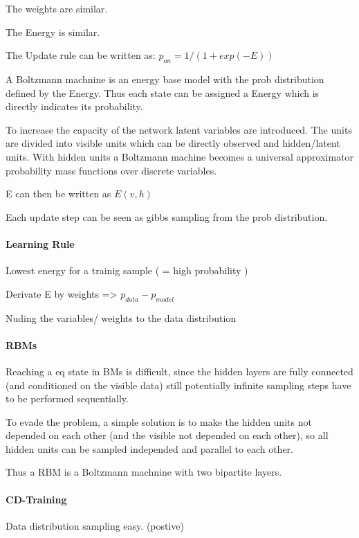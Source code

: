 The weights are similar.

The Energy is similar.

The Update rule can be written as: $ p_{on} = 1 / (1+ exp(-E)) $ 

A Boltzmann machnine is an energy base model with the prob distribution defined by the Energy.
Thus each state can be assigned a Energy which is directly indicates its probability.

To increase the capacity of the network latent variables are introduced. 
The units are divided into visible units which can be directly observed and hidden/latent units.
With hidden units a Boltzmann machine becomes a universal approximator probability mass functions over discrete variables.

E can then be written as $E(v,h)$

Each update step can be seen as gibbs sampling from the prob distribution.

\paragraph{Learning Rule}

Lowest energy for a trainig sample ( = high probability )

Derivate E by weights => $p_{data} - p_{model}$

Nuding the variables/ weights to the data distribution 


\paragraph{RBMs}

Reaching a eq state in BMs is difficult, since the hidden layers are fully connected (and conditioned on the visible data) still potentially infinite sampling steps have to be performed sequentially.

To evade the problem, a simple solution is to make the hidden units not depended on each other (and the visible not depended on each other), so all hidden units can be sampled independed and parallel to each other.

Thus a RBM is a Boltzmann machnine with two bipartite layers.

\paragraph{CD-Training}

Data distribution sampling easy. (postive)

